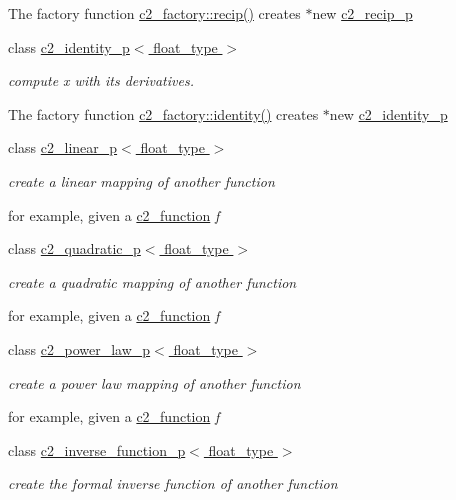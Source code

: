 \begin{DoxyCompactItemize}
\begin{DoxyCompactList}
The factory function \hyperlink{classc2__factory_adda01279d6b1059843e2aecc5be5d95e}{c2\+\_\+factory\+::recip()} creates $\ast$new \hyperlink{classc2__recip__p}{c2\+\_\+recip\+\_\+p} \end{DoxyCompactList}\item 
class \hyperlink{classc2__identity__p}{c2\+\_\+identity\+\_\+p$<$ float\+\_\+type $>$}
\begin{DoxyCompactList}\small\item\em compute x with its derivatives.

The factory function \hyperlink{classc2__factory_a66970667d203c0e63a016b08d2472dc4}{c2\+\_\+factory\+::identity()} creates $\ast$new \hyperlink{classc2__identity__p}{c2\+\_\+identity\+\_\+p} \end{DoxyCompactList}\item 
class \hyperlink{classc2__linear__p}{c2\+\_\+linear\+\_\+p$<$ float\+\_\+type $>$}
\begin{DoxyCompactList}\small\item\em create a linear mapping of another function

for example, given a \hyperlink{classc2__function}{c2\+\_\+function} {\itshape f} \end{DoxyCompactList}\item 
class \hyperlink{classc2__quadratic__p}{c2\+\_\+quadratic\+\_\+p$<$ float\+\_\+type $>$}
\begin{DoxyCompactList}\small\item\em create a quadratic mapping of another function

for example, given a \hyperlink{classc2__function}{c2\+\_\+function} {\itshape f} \end{DoxyCompactList}\item 
class \hyperlink{classc2__power__law__p}{c2\+\_\+power\+\_\+law\+\_\+p$<$ float\+\_\+type $>$}
\begin{DoxyCompactList}\small\item\em create a power law mapping of another function

for example, given a \hyperlink{classc2__function}{c2\+\_\+function} {\itshape f} \end{DoxyCompactList}\item 
class \hyperlink{classc2__inverse__function__p}{c2\+\_\+inverse\+\_\+function\+\_\+p$<$ float\+\_\+type $>$}
\begin{DoxyCompactList}\small\item\em create the formal inverse function of another function


\end{DoxyCompactList}
\end{DoxyCompactItemize}
